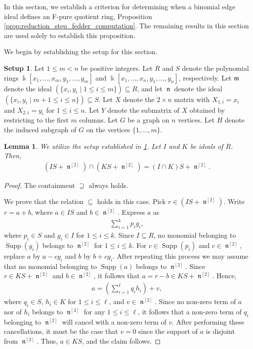 \documentclass[12pt,a4paper]{amsart}
\theoremstyle{plain}
\newtheorem{lem}[thrm]{Lemma}
\def\blem{\begin{lem}}
\def\elem{\end{lem}}
\theoremstyle{definition}
\newtheorem{setup}[thrm]{Setup}
\def\bproof{\begin{proof}}
\def\eproof{\end{proof}}
\theoremstyle{remark}
\def\k{\Bbbk}
\def\m{\mathfrak{m}}
\DeclareMathOperator{\Supp}{Supp}
\DeclareMathOperator{\n}{\mathfrak{n}}
\renewcommand{\subset}{\subseteq}
\renewcommand{\supset}{\supseteq}
\begin{document}
In this section, we establish a criterion for determining when a binomial edge ideal defines an F-pure quotient ring, Proposition \ref{prop:reduction_step_fedder_computation}. The remaining results in this section are used solely to establish this proposition.

We begin by establishing the setup for this section.

\begin{setup}
\label{setup:co_regular_not_f_pure}
Let $1 \leq m < n$ be positive integers. Let $R$ and $S$ denote the polynomial rings $\k[x_{1},\ldots,x_{m},y_{1},\ldots,y_{m}]$ and $\k[x_{1},\ldots,x_{n},y_{1},\ldots,y_{n}]$, respectively. Let $\m$ denote the ideal $( \{x_{i},y_{i} \mid 1 \leq i \leq m \}) \subset R$, and let $\n$ denote the ideal $( \{x_{i},y_{i} \mid m+1 \leq i \leq n \}) \subset S$. Let $X$ denote the $2 \times n$ matrix with $X_{1,i} = x_{i}$ and $X_{2,i} = y_{i}$ for $1 \leq i \leq n$. Let $Y$ denote the submatrix of $X$ obtained by restricting to the first $m$ columns. Let $G$ be a graph on $n$ vertices. Let $H$ denote the induced subgraph of $G$ on the vertices $\{1,\ldots,m\}$.
\end{setup}

\blem
\label{lem:distributivity_intersection_w_sum}
We utilize the setup established in \ref{setup:co_regular_not_f_pure}. Let $I$ and $K$ be ideals of $R$. Then,
\begin{align*}
    (IS + \n^{[2]}) \cap (KS + \n^{[2]}) = (I \cap K) S + \n^{[2]}.
\end{align*}
\elem

\bproof
The containment $\supset$ always holds.

We prove that the relation $\subset$ holds in this case. Pick $r \in (IS + \n^{[2]})$. Write $r = a + b$, where $a \in IS$ and $b \in \n^{[2]}$. Express $a$ as 
\begin{align*}
    \sum_{i=1}^{k} p_{i} g_{i},
\end{align*}
where $p_{i} \in S$ and $g_{i} \in I$ for $1 \leq i \leq k$. Since $I \subset R$, no monomial belonging to $\Supp(g_{i})$ belongs to $\n^{[2]}$ for $1 \leq i \leq k$. For $c \in \Supp(p_{i})$ and $c \in \n^{[2]}$, replace $a$ by $a - cg_{i}$ and $b$ by $b + cg_{i}$. After repeating this process we may assume that no monomial belonging to $\Supp(a)$ belongs to $\n^{[2]}$. Since $r \in KS + \n^{[2]}$ and $b \in \n^{[2]}$, it follows that $a = r - b \in KS+\n^{[2]}$. Hence, 
\begin{align*}
    a = ( \sum_{i=1}^{\ell} q_{i} h_{i} ) + v,
\end{align*}
where $q_{i} \in S$, $h_{i} \in K$ for $1 \leq i \leq \ell$, and $v \in \n^{[2]}$. Since no non-zero term of $a$ nor of $h_{i}$ belongs to $\n^{[2]}$ for any $1 \leq i \leq \ell$, it follows that a non-zero term of $q_{i}$ belonging to $\n^{[2]}$ will cancel with a non-zero term of $v$. After performing these cancellations, it must be the case that $v = 0$ since the support of $a$ is disjoint from $\n^{[2]}$. Thus, $a \in KS$, and the claim follows.
\eproof 
\end{document}
